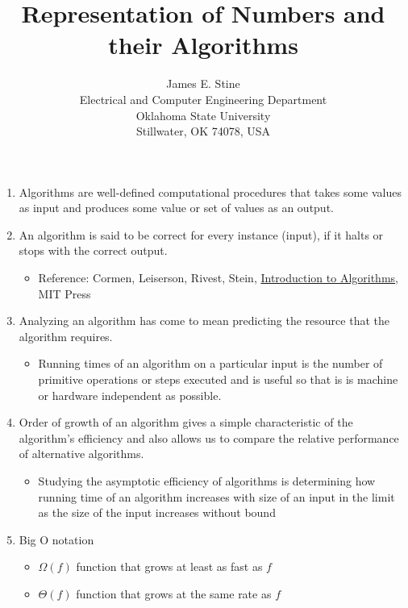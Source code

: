 \documentclass[times, twocolumn, 10pt]{article}
\begin{document}
\title{Representation of Numbers and their Algorithms}
\author{James E. Stine \\
Electrical and Computer Engineering Department\\
Oklahoma State University \\
Stillwater, OK 74078, USA}
\date{}

\maketitle
\begin{enumerate}
\item Algorithms are well-defined computational procedures that takes
  some values as input and produces some value or set of values as an
  output.
\item An algorithm is said to be correct for every instance (input),
  if it halts or stops with the correct output.
  \begin{itemize}
  \item Reference: Cormen, Leiserson, Rivest, Stein,
    \underline{Introduction to Algorithms}, MIT Press
  \end{itemize}
\item Analyzing an algorithm has come to mean predicting the resource
  that the algorithm requires.
  \begin{itemize}
  \item Running times of an algorithm on a particular input is the
    number of primitive operations or steps executed and is useful so
    that is is machine or hardware independent as possible.
  \end{itemize}
\item Order of growth of an algorithm gives a simple characteristic of
  the algorithm's efficiency and also allows us to compare the
  relative performance of alternative algorithms.
  \begin{itemize}
  \item Studying the asymptotic efficiency of algorithms is determining
    how running time of an algorithm increases with size of an input in
    the limit as the size of the input increases without bound
  \end{itemize}
\item Big O notation
  \begin{itemize}
  \item $\Omega(f)$ function that grows at least as fast as $f$
  \item $\Theta(f)$ function that grows at the same rate as $f$

\end{itemize}
\end{enumerate}
\end{document}
